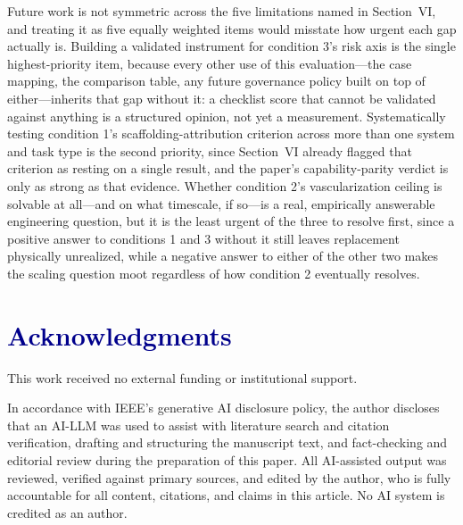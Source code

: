 \documentclass[journal]{IEEEtran}
\begin{document}
Future work is not symmetric across the five limitations named in Section~VI, and
treating it as five equally weighted items would misstate how urgent each gap
actually is. Building a validated instrument for condition 3's risk axis is the
single highest-priority item, because every other use of this evaluation---the case
mapping, the comparison table, any future governance policy built on top of
either---inherits that gap without it: a checklist score that cannot be validated
against anything is a structured opinion, not yet a measurement. Systematically
testing condition 1's scaffolding-attribution criterion across more than one system
and task type is the second priority, since Section~VI already flagged that
criterion as resting on a single result, and the paper's capability-parity verdict
is only as strong as that evidence. Whether condition 2's vascularization ceiling is
solvable at all---and on what timescale, if so---is a real, empirically answerable
engineering question, but it is the least urgent of the three to resolve first,
since a positive answer to conditions 1 and 3 without it still leaves replacement
physically unrealized, while a negative answer to either of the other two makes the
scaling question moot regardless of how condition 2 eventually resolves.

\section*{\textcolor{darkblue}{Acknowledgments}}

This work received no external funding or institutional support.

In accordance with IEEE's generative AI disclosure policy, the author discloses that
an AI-LLM was used to assist with
literature search and citation verification, drafting and structuring the manuscript
text, and fact-checking and editorial review during the preparation of this paper.
All AI-assisted output was reviewed, verified against primary sources, and edited by
the author, who is fully accountable for all content, citations, and claims in this
article. No AI system is credited as an author.



\end{document}
